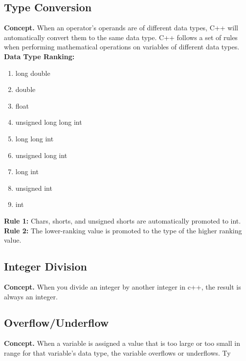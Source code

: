 \documentclass{report}
\begin{document}
    \subsection{Type Conversion}
    \textbf{Concept.} When an operator's operands are of different data types, C++ will automatically convert them to the same data type. C++ follows a set of rules when performing mathematical operations on variables of different data types.
    \bigbreak \noindent 
    \textbf{Data Type Ranking:}
    \begin{enumerate}
        \item long double
        \item double 
        \item float
        \item unsigned long long int
        \item long long int
        \item unsigned long int
        \item long int
        \item unsigned int
        \item int
    \end{enumerate}
    \bigbreak \noindent 
    \textbf{Rule 1:} Chars, shorts, and unsigned shorts are automatically promoted to int.
    \bigbreak \noindent 
    \textbf{Rule 2:} The lower-ranking value is promoted to the type of the higher ranking value.


    \bigbreak \noindent
    \subsection{Integer Division}
    \bigbreak \noindent 
    \textbf{Concept.} When you divide an integer by another integer in c++, the result is always an integer.

    \bigbreak \noindent 
    \subsection{Overflow/Underflow}
    \bigbreak \noindent 
    \textbf{Concept.} When a variable is assigned a value that is too large or too small in range for that variable's data type, the variable overflows or underflows. Ty
    \bigbreak \noindent 
    
    \bigbreak \noindent 
\end{document}
